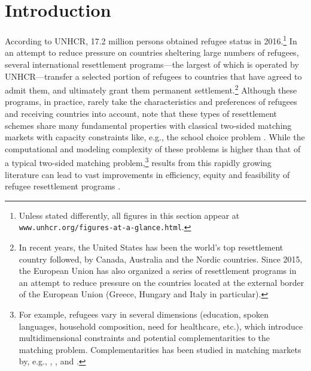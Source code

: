 \documentclass[12pt,fleqn]{article}
\begin{document}

\section{Introduction}
According to UNHCR, 17.2 million persons obtained refugee status in 2016.\footnote{Unless stated differently, all figures in this section appear at \texttt{www.unhcr.org/figures-at-a-glance.html}.} In an attempt to reduce pressure on countries sheltering large numbers of refugees, several international resettlement programs---the largest of which is operated by UNHCR---transfer a selected portion of refugees to countries that have agreed to admit them, and ultimately grant them permanent settlement.\footnote{In recent years, the United States has been the world's top resettlement country followed, by Canada, Australia and the Nordic countries. Since 2015, the European Union has also organized a series of resettlement programs in an attempt to reduce pressure on the countries located at the external border of the European Union (Greece, Hungary and Italy in particular).} Although these programs, in practice, rarely take the characteristics and preferences of refugees and receiving countries into account, \citet{bib:JonesTeytelboym2016b,bib:JonesTeytelboym2016a} note that these types of resettlement schemes share many fundamental properties with classical two-sided matching markets with capacity constraints like, e.g., the school choice problem \citep{bib:AbdulkadirougluSonmez}. While the computational and modeling complexity of these problems is higher than that of a typical two-sided matching problem,\footnote{For example, refugees vary in several dimensions (education, spoken languages, household composition, need for healthcare, etc.), which introduce multidimensional constraints and potential complementarities to the matching problem. Complementarities has been studied in matching markets by, e.g., \citet{bib:HatfieldKominers}, \citet{bib:PathakRoth}, \citet{bib:Pycia} and \citet{bib:RothPeranson}.} results from this rapidly growing literature can lead to vast improvements in efficiency, equity and feasibility of refugee resettlement programs \citep{bib:Andersson,bib:BansakEtAl,bib:DelacretazEtAl2016,bib:JonesTeytelboym2016b, bib:JonesTeytelboym2016a}.
\end{document}
